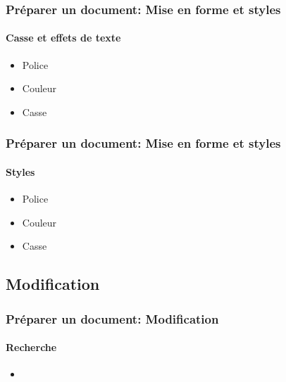 \documentclass[xcolor=table]{beamer}
\begin{document}
\begin{frame}
\frametitle{Préparer un document: Mise en forme et styles}
\framesubtitle{Casse et effets de texte}

\begin{minipage}{0.58\textwidth}
	\begin{itemize}
		\item Police
		\item Couleur 
		\item Casse 
	\end{itemize}
\end{minipage}
\begin{minipage}{0.4\textwidth}
	
\end{minipage}

\end{frame}


\begin{frame}
\frametitle{Préparer un document: Mise en forme et styles}
\framesubtitle{Styles}

\begin{minipage}{0.58\textwidth}
	\begin{itemize}
		\item Police
		\item Couleur 
		\item Casse 
	\end{itemize}
\end{minipage}
\begin{minipage}{0.4\textwidth}
	
	\vspace{12pt}
	
\end{minipage}

\end{frame}

\subsection{Modification}%

\begin{frame}[t]
\frametitle{Préparer un document: Modification}
\framesubtitle{Recherche}

\begin{minipage}{0.60\textwidth}
	\begin{itemize}
		\item 
	\end{itemize}
\end{minipage}
\begin{minipage}{0.38\textwidth}
	\begin{flushright}
	\end{flushright}

	\vspace{-12pt}
\end{minipage}

\end{frame}
\end{document}

